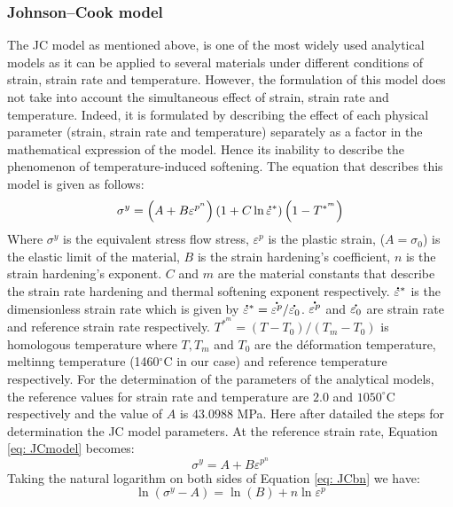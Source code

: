 \documentclass[twoside,english,1p,final,sort&compress]{elsarticle}
\theoremstyle{plain}
\newcommand{\mdot}[1]{\accentset{\mbox{\bfseries .}}{#1}}
\begin{document}
\subsubsection{Johnson--Cook model\label{sec:JC}}
The JC model as mentioned above, is one of the most widely used analytical models as it can be applied to several materials under different conditions of strain, strain rate and temperature. However, the formulation of this model does not take into account the simultaneous effect of strain, strain rate and temperature. Indeed, it is formulated by describing the effect of each physical parameter (strain, strain rate and temperature) separately as a factor in the mathematical expression of the model. Hence its inability to describe the phenomenon of temperature-induced softening. The equation that describes this model is given as follows:
\begin{equation}
\label{eq: JCmodel}
\sigma^y = \left(A + B\varepsilon^{p^n}\right)\left(1+C\ln\mdot{\varepsilon}^*\right)\left(1-T^{*^m}\right)
\end{equation}
Where $\sigma^y$ is the equivalent stress flow stress, $\varepsilon^p$ is the plastic strain, ($A=\sigma_0$) is the elastic limit of the material, $B$ is the strain hardening's coefficient, $n$ is the strain hardening's exponent. $C$ and $m$ are the material constants that describe the strain rate hardening and thermal softening exponent respectively. $\mdot{\varepsilon}^*$ is the dimensionless strain rate which is given by $\mdot{\varepsilon}^* = \mdot{\varepsilon^p}/\mdot{\varepsilon_0}$. $\mdot{\varepsilon^p}$ and $\mdot{\varepsilon_0}$ are strain rate and reference strain rate respectively. $T^{*^m} = (T-T_0)/(T_m - T_0)$ is homologous temperature where $T, T_m$ and $T_0$ are the déformation temperature, meltinng temperature (1460$^\circ$C in our case) and reference temperature respectively. For the determination of the parameters of the analytical models, the reference values for strain rate and temperature are $2.0$ and $1050^\circ$C respectively and the value of $A$ is $43.0988$ MPa. Here after datailed the steps for determination the JC model parameters.
At the reference strain rate, Equation \ref{eq: JCmodel} becomes:
\begin{equation}
\label{eq: JCbn}
\sigma^y = A + B\varepsilon^{p^n}
\end{equation}
Taking the natural logarithm on both sides of Equation \ref{eq: JCbn} we have:
\begin{equation}
\label{eq:JClog1}
\ln\left(\sigma^y-A\right)= \ln(B) + n\ln\varepsilon^p
\end{equation}
\end{document}

